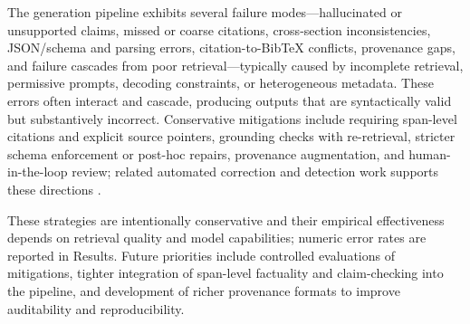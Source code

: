 The generation pipeline exhibits several failure modes—hallucinated or unsupported claims, missed or coarse citations, cross-section inconsistencies, JSON/schema and parsing errors, citation-to-BibTeX conflicts, provenance gaps, and failure cascades from poor retrieval—typically caused by incomplete retrieval, permissive prompts, decoding constraints, or heterogeneous metadata. These errors often interact and cascade, producing outputs that are syntactically valid but substantively incorrect. Conservative mitigations include requiring span-level citations and explicit source pointers, grounding checks with re-retrieval, stricter schema enforcement or post-hoc repairs, provenance augmentation, and human-in-the-loop review; related automated correction and detection work supports these directions \cite{web_thorne_2021_evidence_based_factual_error_correction,web_bayat_2023_fleek_factual_error_detection_and_correction_wit,web_macavaney_2018_overcoming_low_utility_facets_for_complex_answer}.

These strategies are intentionally conservative and their empirical effectiveness depends on retrieval quality and model capabilities; numeric error rates are reported in Results. Future priorities include controlled evaluations of mitigations, tighter integration of span-level factuality and claim-checking into the pipeline, and development of richer provenance formats to improve auditability and reproducibility.